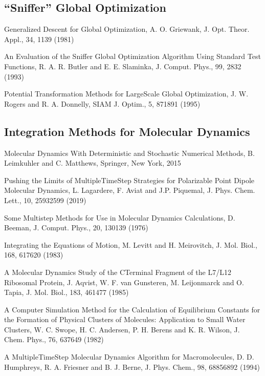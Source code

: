 \documentclass[letterpaper,11pt,english]{sphinxmanual}
\begin{document}
\subsection{“Sniffer” Global Optimization}
\label{\detokenize{text/references:sniffer-global-optimization}}
Generalized Descent for Global Optimization, A. O. Griewank, J. Opt. Theor. Appl., 34, 11\sphinxhyphen{}39 (1981)

An Evaluation of the Sniffer Global Optimization Algorithm Using Standard Test Functions, R. A. R. Butler and E. E. Slaminka, J. Comput. Phys., 99, 28\sphinxhyphen{}32 (1993)

Potential Transformation Methods for Large\sphinxhyphen{}Scale Global Optimization, J. W. Rogers and R. A. Donnelly, SIAM J. Optim., 5, 871\sphinxhyphen{}891 (1995)


\subsection{Integration Methods for Molecular Dynamics}
\label{\detokenize{text/references:integration-methods-for-molecular-dynamics}}
Molecular Dynamics With Deterministic and Stochastic Numerical Methods, B. Leimkuhler and C. Matthews, Springer, New York, 2015

Pushing the Limits of Multiple\sphinxhyphen{}Time\sphinxhyphen{}Step Strategies for Polarizable Point Dipole Molecular Dynamics, L. Lagardere, F. Aviat and J.\sphinxhyphen{}P. Piquemal, J. Phys. Chem. Lett., 10, 2593\sphinxhyphen{}2599 (2019)

Some Multistep Methods for Use in Molecular Dynamics Calculations, D. Beeman, J. Comput. Phys., 20, 130\sphinxhyphen{}139 (1976)

Integrating the Equations of Motion, M. Levitt and H. Meirovitch, J. Mol. Biol., 168, 617\sphinxhyphen{}620 (1983)

A Molecular Dynamics Study of the C\sphinxhyphen{}Terminal Fragment of the L7/L12 Ribosomal Protein, J. Aqvist, W. F. van Gunsteren, M. Leijonmarck and O. Tapia, J. Mol. Biol., 183, 461\sphinxhyphen{}477 (1985)

A Computer Simulation Method for the Calculation of Equilibrium Constants for the Formation of Physical Clusters of Molecules: Application to Small Water Clusters, W. C. Swope, H. C. Andersen, P. H. Berens and K. R. Wilson, J. Chem. Phys., 76, 637\sphinxhyphen{}649 (1982)

A Multiple\sphinxhyphen{}Time\sphinxhyphen{}Step Molecular Dynamics Algorithm for Macromolecules, D. D. Humphreys, R. A. Friesner and B. J. Berne, J. Phys. Chem., 98, 6885\sphinxhyphen{}6892 (1994)
\end{document}
